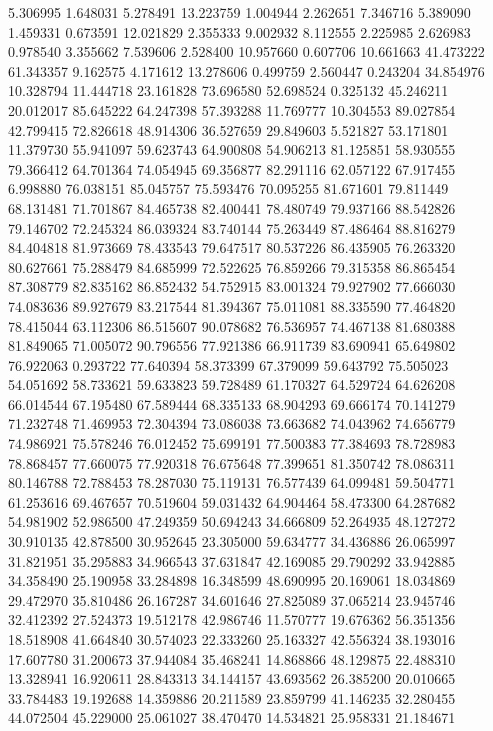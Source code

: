 5.306995
1.648031
5.278491
13.223759
1.004944
2.262651
7.346716
5.389090
1.459331
0.673591
12.021829
2.355333
9.002932
8.112555
2.225985
2.626983
0.978540
3.355662
7.539606
2.528400
10.957660
0.607706
10.661663
41.473222
61.343357
9.162575
4.171612
13.278606
0.499759
2.560447
0.243204
34.854976
10.328794
11.444718
23.161828
73.696580
52.698524
0.325132
45.246211
20.012017
85.645222
64.247398
57.393288
11.769777
10.304553
89.027854
42.799415
72.826618
48.914306
36.527659
29.849603
5.521827
53.171801
11.379730
55.941097
59.623743
64.900808
54.906213
81.125851
58.930555
79.366412
64.701364
74.054945
69.356877
82.291116
62.057122
67.917455
6.998880
76.038151
85.045757
75.593476
70.095255
81.671601
79.811449
68.131481
71.701867
84.465738
82.400441
78.480749
79.937166
88.542826
79.146702
72.245324
86.039324
83.740144
75.263449
87.486464
88.816279
84.404818
81.973669
78.433543
79.647517
80.537226
86.435905
76.263320
80.627661
75.288479
84.685999
72.522625
76.859266
79.315358
86.865454
87.308779
82.835162
86.852432
54.752915
83.001324
79.927902
77.666030
74.083636
89.927679
83.217544
81.394367
75.011081
88.335590
77.464820
78.415044
63.112306
86.515607
90.078682
76.536957
74.467138
81.680388
81.849065
71.005072
90.796556
77.921386
66.911739
83.690941
65.649802
76.922063
0.293722
77.640394
58.373399
67.379099
59.643792
75.505023
54.051692
58.733621
59.633823
59.728489
61.170327
64.529724
64.626208
66.014544
67.195480
67.589444
68.335133
68.904293
69.666174
70.141279
71.232748
71.469953
72.304394
73.086038
73.663682
74.043962
74.656779
74.986921
75.578246
76.012452
75.699191
77.500383
77.384693
78.728983
78.868457
77.660075
77.920318
76.675648
77.399651
81.350742
78.086311
80.146788
72.788453
78.287030
75.119131
76.577439
64.099481
59.504771
61.253616
69.467657
70.519604
59.031432
64.904464
58.473300
64.287682
54.981902
52.986500
47.249359
50.694243
34.666809
52.264935
48.127272
30.910135
42.878500
30.952645
23.305000
59.634777
34.436886
26.065997
31.821951
35.295883
34.966543
37.631847
42.169085
29.790292
33.942885
34.358490
25.190958
33.284898
16.348599
48.690995
20.169061
18.034869
29.472970
35.810486
26.167287
34.601646
27.825089
37.065214
23.945746
32.412392
27.524373
19.512178
42.986746
11.570777
19.676362
56.351356
18.518908
41.664840
30.574023
22.333260
25.163327
42.556324
38.193016
17.607780
31.200673
37.944084
35.468241
14.868866
48.129875
22.488310
13.328941
16.920611
28.843313
34.144157
43.693562
26.385200
20.010665
33.784483
19.192688
14.359886
20.211589
23.859799
41.146235
32.280455
44.072504
45.229000
25.061027
38.470470
14.534821
25.958331
21.184671
